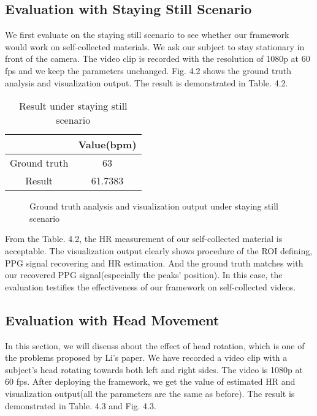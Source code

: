 \subsection{Evaluation with Staying Still Scenario}
We first evaluate on the staying still scenario to see whether our framework would work on self-collected materials. We ask our subject to stay stationary in front of the camera. The video clip is recorded with the resolution of 1080p at 60 fps and we keep the parameters unchanged.  Fig. 4.2 shows the ground truth analysis and visualization output. The result is demonstrated in Table. 4.2.



\begin{table}[htbp]
\centering
\caption{Result under staying still scenario} \label{tab:simpletable}
\begin{tabular}{|c|c|}
    \hline
     & Value(bpm) \\
    \hline
    Ground truth & 63 \\
    \hline
    Result & 61.7383 \\
    \hline
\end{tabular}
\end{table}

\begin{figure}[ht]
\hspace{-0.3in}
\caption{Ground truth analysis and visualization output under staying still scenario}\label{fig:noted-figure}
\end{figure}


From the Table. 4.2, the HR measurement of our self-collected material is acceptable. The visualization output clearly shows procedure of the ROI defining, PPG signal recovering and HR estimation. And the ground truth matches with our recovered PPG signal(especially the peaks' position). In this case, the evaluation testifies the effectiveness of our framework on self-collected videos.

\subsection{Evaluation with Head Movement}
In this section, we will discuss about the effect of head rotation, which is one of the problems proposed by Li's paper. We have recorded a video clip with a subject's head rotating towards both left and right sides. The video is 1080p at 60 fps. After deploying the framework, we get the value of estimated HR and visualization output(all the parameters are the same as before).  The result is demonstrated in Table. 4.3 and Fig. 4.3.


